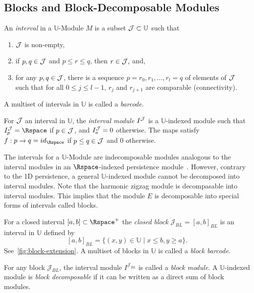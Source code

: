 \subsection{Blocks and Block-Decomposable Modules}


An \emph{interval} in a $\mathbb{U}$-Module $M$ is a subset ${\cal{J}} \subset \mathbb{U}$ such that 
\begin{enumerate}
    \item ${\cal{J}}$ is non-empty,
    \item if $p,q \in {\cal{J}}$ and $p \leq r \leq q$, then $r \in {\cal{J}},$ and,
    \item for any $p,q \in {\cal{J}}$, there is a sequence $p = r_0, r_1, \ldots, r_l = q$ of elements of ${\cal{J}}$ such that for all $0 \leq j \leq l-1$, $r_j$ and $r_{j+1}$ are comparable (connectivity). 
\end{enumerate}

A multiset of intervals in $\mathbb{U}$ is called a \emph{barcode}.

For ${\cal{J}}$ an interval in $\mathbb{U}$, the \emph{interval module $I^{{\cal{J}}}$} is a $\mathbb{U}$-indexed module such that $I^{{\cal{J}}}_p = \Rspace$ if $p \in {\cal{J}}$, and $I_a^{{\cal{J}}}=0$ otherwise. The maps satisfy $f:p\xrightarrow{} q = id_{\Rspace}$ if $p \leq q \in {\cal{J}}$ and $0$ otherwise.


The intervals for a $\mathbb{U}$-Module are indecomposable modules analogous to the interval modules in an $\Rspace$-indexed persistence module~\cite[Prop. 2.2]{botnan2018algebraic}. However, contrary to the 1D persistence, a general $\mathbb{U}$-indexed module cannot be  decomposed into interval modules. Note that the harmonic zigzag module is decompasable into interval modules. This implies that the module $E$ is decomposable into special forms of intervals called blocks.

For a closed interval $[a,b] \subset \Rspace^+$ the \emph{closed block} ${\mathcal{J}_{BL}} = [a,b]_{BL}$ is an interval in $\mathbb{U}$ defined by $$ [a,b]_{BL} = \{ (x,y) \in \mathbb{U}\mid  x \leq b,  y \geq a \}.$$ See~\cref{fig:block-extension}. 
A multiset of blocks in $\mathbb{U}$ is called a \emph{block barcode}. 




For any block ${\mathcal{J}_{BL}}$, the interval module $I^{{\mathcal{J}_{BL}}}$ is called a \emph{block module}. 
A $\mathbb{U}$-indexed module is \emph{block decomposable} if it can be written as a direct sum of block modules. 

